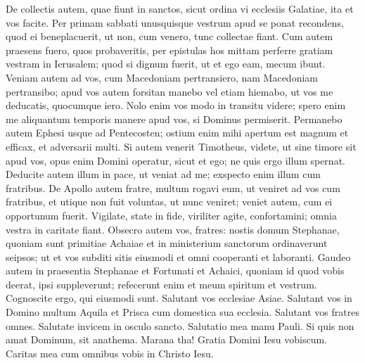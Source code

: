 \begin{biblechapter} 
\verse De collectis autem, quae fiunt in sanctos, sicut ordina vi ecclesiis Galatiae, ita et vos facite. 
\verse Per primam sabbati unusquisque vestrum apud se ponat recondens, quod ei beneplacuerit, ut non, cum venero, tunc collectae fiant. 
\verse Cum autem praesens fuero, quos probaveritis, per epistulas hos mittam perferre gratiam vestram in Ierusalem; 
\verse quod si dignum fuerit, ut et ego eam, mecum ibunt. 
\verse Veniam autem ad vos, cum Macedoniam pertransiero, nam Macedoniam pertransibo; 
\verse apud vos autem forsitan manebo vel etiam hiemabo, ut vos me deducatis, quocumque iero. 
\verse Nolo enim vos modo in transitu videre; spero enim me aliquantum temporis manere apud vos, si Dominus permiserit. 
\verse Permanebo autem Ephesi usque ad Pentecosten; 
\verse ostium enim mihi apertum est magnum et efficax, et adversarii multi. 
\verse Si autem venerit Timotheus, videte, ut sine timore sit apud vos, opus enim Domini operatur, sicut et ego; 
\verse ne quis ergo illum spernat. Deducite autem illum in pace, ut veniat ad me; exspecto enim illum cum fratribus. 
\verse De Apollo autem fratre, multum rogavi eum, ut veniret ad vos cum fratribus, et utique non fuit voluntas, ut nunc veniret; veniet autem, cum ei opportunum fuerit. 
\verse Vigilate, state in fide, viriliter agite, confortamini; 
\verse omnia vestra in caritate fiant. 
\verse Obsecro autem vos, fratres: nostis domum Stephanae, quoniam sunt primitiae Achaiae et in ministerium sanctorum ordinaverunt seipsos;  
\verse ut et vos subditi sitis eiusmodi et omni cooperanti et laboranti. 
\verse Gaudeo autem in praesentia Stephanae et Fortunati et Achaici, quoniam id quod vobis deerat, ipsi suppleverunt; 
\verse refecerunt enim et meum spiritum et vestrum. Cognoscite ergo, qui eiusmodi sunt. 
\verse Salutant vos ecclesiae Asiae. Salutant vos in Domino multum Aquila et Prisca cum domestica sua ecclesia. 
\verse Salutant vos fratres omnes. Salutate invicem in osculo sancto. 
\verse Salutatio mea manu Pauli. 
\verse Si quis non amat Dominum, sit anathema. Marana tha! 
\verse Gratia Domini Iesu vobiscum. 
\verse Caritas mea cum omnibus vobis in Christo Iesu.   
\end{biblechapter}

